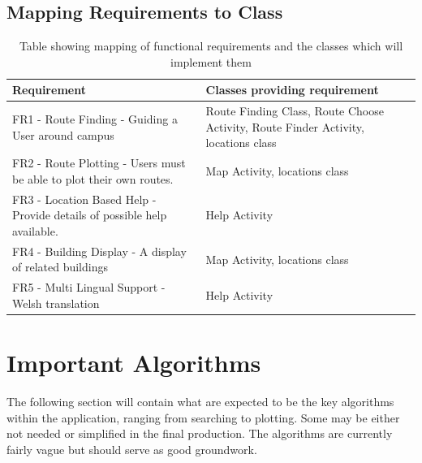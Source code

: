 \subsection{Mapping Requirements to Class}
\begin{center}
\begin{table}[H]

    \begin{tabular}{ | p{7cm} | p{7cm} |}
    \hline
    Requirement & Classes providing requirement  \\ \hline
    FR1 - Route Finding - Guiding a User around campus & Route Finding Class, Route Choose Activity, Route Finder Activity, locations class  \\ \hline
    FR2 - Route Plotting - Users must be able to plot their own routes.& Map Activity, locations class  \\ \hline
   FR3 - Location Based Help - Provide details of possible help available. & Help Activity  \\ \hline
   FR4 - Building Display - A display of related buildings & Map Activity, locations class \\ \hline
   FR5 - Multi Lingual Support - Welsh translation & Help Activity \\ \hline
    \end{tabular}
    \caption[FR Mapping to classes]{Table showing mapping of functional requirements and the classes which will implement them}
\end{table}
\end{center}
\section{Important Algorithms}
The following section will contain what are expected to be the key algorithms within the application, ranging from searching to plotting. Some may be either not needed or simplified in the final production. The algorithms are currently fairly vague but should serve as good groundwork. 
